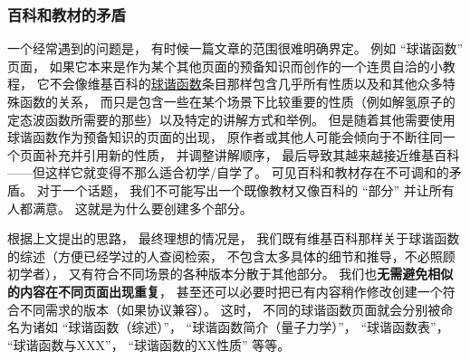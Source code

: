 




\subsubsection{百科和教材的矛盾}
一个经常遇到的问题是， 有时候一篇文章的范围很难明确界定。 例如 “球谐函数” 页面， 如果它本来是作为某个其他页面的预备知识而创作的一个连贯自洽的小教程， 它不会像维基百科的\href{https://en.wikipedia.org/wiki/Spherical_harmonics}{球谐函数}条目那样包含几乎所有性质以及和其他众多特殊函数的关系， 而只是包含一些在某个场景下比较重要的性质（例如解氢原子的定态波函数所需要的那些）以及特定的讲解方式和举例。 但是随着其他需要使用球谐函数作为预备知识的页面的出现， 原作者或其他人可能会倾向于不断往同一个页面补充并引用新的性质， 并调整讲解顺序， 最后导致其越来越接近维基百科——但这样它就变得不那么适合初学/自学了。 可见百科和教材存在不可调和的矛盾。 对于一个话题， 我们不可能写出一个既像教材又像百科的 “部分” 并让所有人都满意。 这就是为什么要创建多个部分。

根据上文提出的思路， 最终理想的情况是， 我们既有维基百科那样关于球谐函数的综述（方便已经学过的人查阅检索， 不包含太多具体的细节和推导，不必照顾初学者）， 又有符合不同场景的各种版本分散于其他部分。 我们也\textbf{无需避免相似的内容在不同页面出现重复}， 甚至还可以必要时把已有内容稍作修改创建一个符合不同需求的版本（如果协议兼容）。 这时， 不同的球谐函数页面就会分别被命名为诸如 “球谐函数（综述）”， “球谐函数简介（量子力学）”， “球谐函数表”， “球谐函数与XXX”， “球谐函数的XX性质” 等等。
